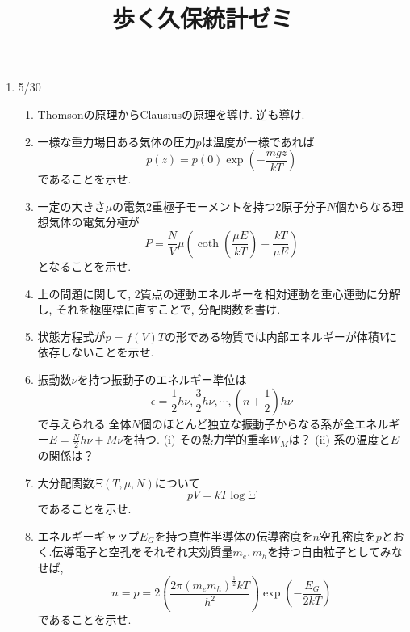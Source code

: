\documentclass[11pt,a4paper]{jarticle}
\title{歩く久保統計ゼミ}
\author{}
\date{}
\begin{document}
\maketitle
\begin{enumerate}
    \item 5/30
    \begin{enumerate}
        \item Thomsonの原理からClausiusの原理を導け. 逆も導け.
        \item 一様な重力場日ある気体の圧力$p$は温度が一様であれば
        \begin{equation}
            p(z)=p(0)\exp(-\frac{mgz}{kT})
        \end{equation}
        であることを示せ.
        \item 一定の大きさ$\mu$の電気2重極子モーメントを持つ2原子分子$N$個からなる理想気体の電気分極が
        \begin{equation*}
            P=\frac{N}{V}\mu(\coth(\frac{\mu E}{kT})-\frac{kT}{\mu E})
        \end{equation*}
        となることを示せ.
        \item 上の問題に関して, 2質点の運動エネルギーを相対運動を重心運動に分解し, それを極座標に直すことで, 分配関数を書け.
        \item 状態方程式が$p=f(V)T$の形である物質では内部エネルギーが体積$V$に依存しないことを示せ.
        \item 振動数$\nu$を持つ振動子のエネルギー準位は
        \begin{equation*}
            \epsilon = \frac{1}{2}h\nu, \frac{3}{2}h\nu, \cdots ,(n+\frac{1}{2})h\nu
        \end{equation*}
        で与えられる.全体$N$個のほとんど独立な振動子からなる系が全エネルギー$E=\frac{N}{2}h\nu+M\nu$を持つ.
        (i) その熱力学的重率$W_M$は？
        (ii) 系の温度と$E$の関係は？
        \item 大分配関数$\Xi(T,\mu, N)$について
        \begin{equation*}
            pV=kT\log\Xi
        \end{equation*}
        であることを示せ.
        \item エネルギーギャップ$E_G$を持つ真性半導体の伝導密度を$n$空孔密度を$p$とおく.伝導電子と空孔をそれぞれ実効質量$m_e, m_h$を持つ自由粒子としてみなせば,
        \begin{equation*}
            n=p=2(\frac{2\pi(m_em_h)^{\frac{1}{2}}kT}{h^2})\exp(-\frac{E_G}{2kT})
        \end{equation*}
        であることを示せ.
    \end{enumerate}
\end{enumerate}
\end{document}
